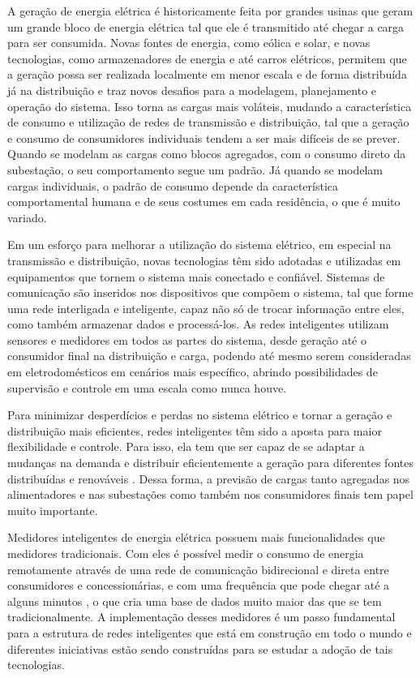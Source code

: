 \documentclass[
	12pt,				%
	oneside,			%
	a4paper,			%
	english,			%
	brazil				%
	]{abntex2}
\begin{document}

	A geração de energia elétrica é historicamente feita por grandes usinas que geram um grande bloco de energia elétrica tal que ele é transmitido até chegar a carga para ser consumida. Novas fontes de energia, como eólica e solar, e novas tecnologias, como armazenadores de energia e até carros elétricos, permitem que a geração possa ser realizada localmente em menor escala e de forma distribuída já na distribuição e traz novos desafios para a modelagem, planejamento e operação do sistema. Isso torna as cargas mais voláteis, mudando a característica de consumo e utilização de redes de transmissão e distribuição, tal que a geração e consumo de consumidores individuais tendem a ser mais difíceis de se prever. Quando se modelam as cargas como blocos agregados, com o consumo direto da subestação, o seu comportamento segue um padrão. Já quando se modelam cargas individuais, o padrão de consumo depende da característica comportamental humana e de seus costumes em cada residência, o que é muito variado. \cite{kong2017short}		
	
	Em um esforço para melhorar a utilização do sistema elétrico, em especial na transmissão e distribuição, novas tecnologias têm sido adotadas e utilizadas em equipamentos que tornem o sistema mais conectado e confiável. Sistemas de comunicação são inseridos nos dispositivos que compõem o sistema, tal que forme uma rede interligada e inteligente, capaz não só de trocar informação entre eles, como também armazenar dados e processá-los. As redes inteligentes utilizam sensores e medidores em todos as partes do sistema, desde geração até o consumidor final na distribuição e carga, podendo até mesmo serem consideradas em eletrodomésticos em cenários mais específico, abrindo possibilidades de supervisão e controle em uma escala como nunca houve. 
	
	Para minimizar desperdícios e perdas no sistema elétrico e tornar a geração e distribuição mais eficientes, redes inteligentes têm sido a aposta para maior flexibilidade e controle. Para isso, ela tem que ser capaz de se adaptar a mudanças na demanda e distribuir eficientemente a geração para diferentes fontes distribuídas e renováveis \cite{choueiki1997building}. Dessa forma, a previsão de cargas tanto agregadas nos alimentadores e nas subestações como também nos consumidores finais tem papel muito importante.
	
	Medidores inteligentes de energia elétrica possuem mais funcionalidades que medidores tradicionais. Com eles é possível medir o consumo de energia remotamente através de uma rede de comunicação bidirecional e direta entre consumidores e concessionárias, e com uma frequência que pode chegar até a alguns minutos \cite{trials2008findings}, o que cria uma base de dados muito maior das que se tem tradicionalmente. A implementação desses medidores é um passo fundamental para a estrutura de redes inteligentes que está em construção em todo o mundo e diferentes iniciativas estão sendo construídas para se estudar a adoção de tais tecnologias.
	
\end{document}
